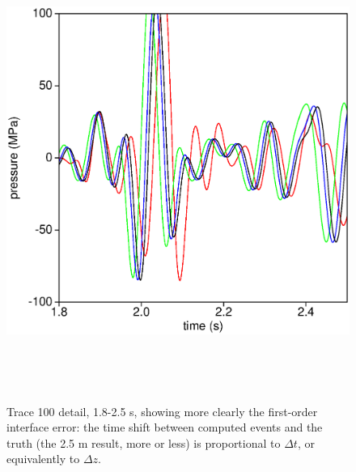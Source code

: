 \begin{figure}
\includegraphics[height=15cm,width=15cm]{./Fig/fig5.ps}
\caption{Trace 100 detail, 1.8-2.5 s, showing more clearly the
  first-order interface error: the time shift between computed events
  and the truth (the 2.5 m result, more or less) is proportional to
  $\Delta t$, or equivalently to $\Delta z$.}
\label{fig:wtrace}
\end{figure}

